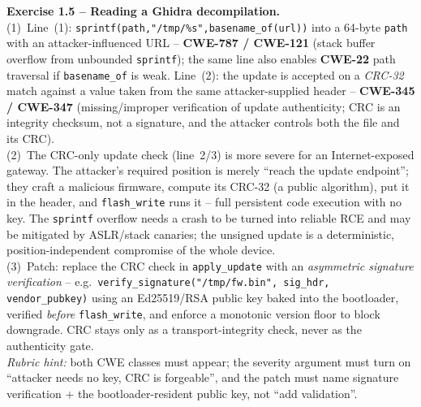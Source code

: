 \documentclass[11pt,a4paper]{article}
\begin{document}
\begin{solutionbox}
\textbf{Exercise 1.5 -- Reading a Ghidra decompilation.}\\[2pt]
(1)~Line~(1): \texttt{sprintf(path,"/tmp/\%s",basename\_of(url))} into a 64-byte
\texttt{path} with an attacker-influenced URL -- \textbf{CWE-787 / CWE-121} (stack buffer
overflow from unbounded \texttt{sprintf}); the same line also enables \textbf{CWE-22} path
traversal if \texttt{basename\_of} is weak. Line~(2): the update is accepted on a \emph{CRC-32}
match against a value taken from the same attacker-supplied header -- \textbf{CWE-345 /
CWE-347} (missing/improper verification of update authenticity; CRC is an integrity checksum,
not a signature, and the attacker controls both the file and its CRC).\\[2pt]
(2)~The CRC-only update check (line~2/3) is more severe for an Internet-exposed gateway. The
attacker's required position is merely ``reach the update endpoint''; they craft a malicious
firmware, compute its CRC-32 (a public algorithm), put it in the header, and \texttt{flash\_write}
runs it -- full persistent code execution with no key. The \texttt{sprintf} overflow needs a
crash to be turned into reliable RCE and may be mitigated by ASLR/stack canaries; the unsigned
update is a deterministic, position-independent compromise of the whole device.\\[2pt]
(3)~Patch: replace the CRC check in \texttt{apply\_update} with an \emph{asymmetric signature
verification} -- e.g.\ \texttt{verify\_signature("/tmp/fw.bin", sig\_hdr, vendor\_pubkey)} using
an Ed25519/RSA public key baked into the bootloader, verified \emph{before} \texttt{flash\_write},
and enforce a monotonic version floor to block downgrade. CRC stays only as a transport-integrity
check, never as the authenticity gate.\\[2pt]
\emph{Rubric hint:} both CWE classes must appear; the severity argument must turn on
``attacker needs no key, CRC is forgeable'', and the patch must name signature verification +
the bootloader-resident public key, not ``add validation''.
\end{solutionbox}
\end{document}
